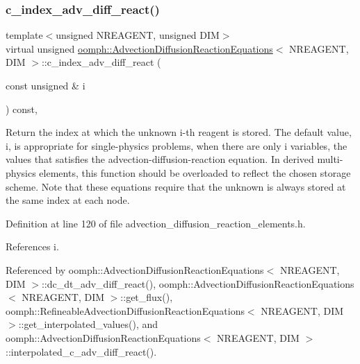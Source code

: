 \subsubsection{\texorpdfstring{c\+\_\+index\+\_\+adv\+\_\+diff\+\_\+react()}{c\_index\_adv\_diff\_react()}}
{\footnotesize\ttfamily template$<$unsigned N\+R\+E\+A\+G\+E\+NT, unsigned D\+IM$>$ \\
virtual unsigned \hyperlink{classoomph_1_1AdvectionDiffusionReactionEquations}{oomph\+::\+Advection\+Diffusion\+Reaction\+Equations}$<$ N\+R\+E\+A\+G\+E\+NT, D\+IM $>$\+::c\+\_\+index\+\_\+adv\+\_\+diff\+\_\+react (\begin{DoxyParamCaption}\item[{const unsigned \&}]{i }\end{DoxyParamCaption}) const\hspace{0.3cm}{\ttfamily [inline]}, {\ttfamily [virtual]}}



Return the index at which the unknown i-\/th reagent is stored. The default value, i, is appropriate for single-\/physics problems, when there are only i variables, the values that satisfies the advection-\/diffusion-\/reaction equation. In derived multi-\/physics elements, this function should be overloaded to reflect the chosen storage scheme. Note that these equations require that the unknown is always stored at the same index at each node. 



Definition at line 120 of file advection\+\_\+diffusion\+\_\+reaction\+\_\+elements.\+h.



References i.



Referenced by oomph\+::\+Advection\+Diffusion\+Reaction\+Equations$<$ N\+R\+E\+A\+G\+E\+N\+T, D\+I\+M $>$\+::dc\+\_\+dt\+\_\+adv\+\_\+diff\+\_\+react(), oomph\+::\+Advection\+Diffusion\+Reaction\+Equations$<$ N\+R\+E\+A\+G\+E\+N\+T, D\+I\+M $>$\+::get\+\_\+flux(), oomph\+::\+Refineable\+Advection\+Diffusion\+Reaction\+Equations$<$ N\+R\+E\+A\+G\+E\+N\+T, D\+I\+M $>$\+::get\+\_\+interpolated\+\_\+values(), and oomph\+::\+Advection\+Diffusion\+Reaction\+Equations$<$ N\+R\+E\+A\+G\+E\+N\+T, D\+I\+M $>$\+::interpolated\+\_\+c\+\_\+adv\+\_\+diff\+\_\+react().

\mbox{\label{classoomph_1_1AdvectionDiffusionReactionEquations_a19c48ef418ac58dede7b397971fa7379}} 

